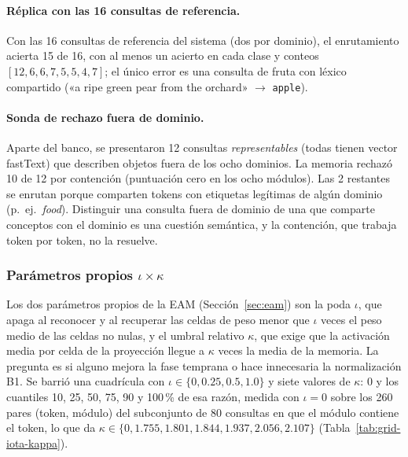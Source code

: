 \paragraph{Réplica con las 16 consultas de referencia.}
Con las 16 consultas de referencia del sistema (dos por dominio),
el enrutamiento acierta 15 de 16, con al menos un acierto en cada clase y conteos
$[12, 6, 6, 7, 5, 5, 4, 7]$;
el único error es una consulta de fruta con léxico compartido
(«a ripe green pear from the orchard» $\to$ \texttt{apple}).

\paragraph{Sonda de rechazo fuera de dominio.}
Aparte del banco, se presentaron 12 consultas \emph{representables} (todas tienen vector
fastText) que describen objetos fuera de los ocho dominios.
La memoria rechazó 10 de 12 por contención (puntuación cero en los ocho módulos).
Las 2 restantes se enrutan porque comparten tokens con etiquetas legítimas de algún
dominio (p.\ ej.\ \textit{food}).
Distinguir una consulta fuera de dominio de una que comparte conceptos con el dominio es
una cuestión semántica, y la contención, que trabaja token por token, no la resuelve.

\subsubsection[Parámetros propios iota x kappa]{Parámetros propios $\iota \times \kappa$}
\label{sec:param-iota-kappa}

Los dos parámetros propios de la EAM (Sección~\ref{sec:eam}) son la poda $\iota$, que
apaga al reconocer y al recuperar las celdas de peso menor que $\iota$ veces el peso
medio de las celdas no nulas, y el umbral relativo $\kappa$, que exige que la activación
media por celda de la proyección llegue a $\kappa$ veces la media de la memoria.
La pregunta es si alguno mejora la fase temprana o hace innecesaria la normalización B1.
Se barrió una cuadrícula con $\iota \in \{0, 0.25, 0.5, 1.0\}$ y siete valores de
$\kappa$: 0 y los cuantiles 10, 25, 50, 75, 90 y 100\,\% de esa razón, medida con
$\iota = 0$ sobre los 260 pares (token, módulo) del subconjunto de 80 consultas en que el
módulo contiene el token, lo que da
$\kappa \in \{0, 1.755, 1.801, 1.844, 1.937, 2.056, 2.107\}$
(Tabla~\ref{tab:grid-iota-kappa}).

